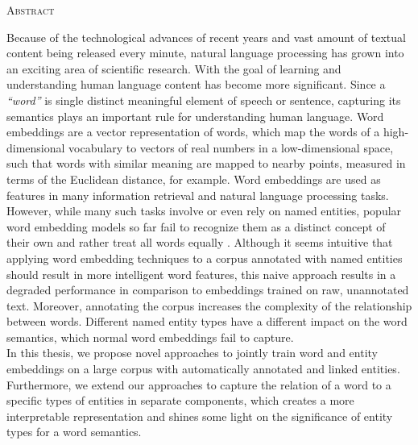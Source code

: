 \begin{center}
  \textsc{Abstract}
\end{center}
%
\noindent
%
Because of the technological advances of recent years and vast amount of textual content being released every minute, natural language processing has grown into an exciting area of scientific research. With the goal of learning and understanding human language content has become more significant.
Since a \emph{``word''} is single distinct meaningful element of speech or sentence, capturing its semantics plays an important rule for understanding human language.
Word embeddings are a vector representation of words, which map the words of a high-dimensional vocabulary to vectors of real numbers in a low-dimensional space, such that words with similar meaning are mapped to nearby points, measured in terms of the Euclidean distance, for example.
Word embeddings are used as features in many information retrieval and natural language processing tasks. However, while many such tasks involve or even rely on named entities, popular word embedding models so far fail to recognize them as a distinct concept of their own and rather treat all words equally .
Although it seems intuitive that applying word embedding techniques to a corpus annotated with named entities should result in more intelligent word features, this naive approach results in a degraded performance in comparison to embeddings trained on raw, unannotated text.
Moreover, annotating the corpus increases the complexity of the relationship between words. Different named entity types have a different impact on the word semantics, which normal word embeddings fail to capture.
\\
In this thesis, we propose novel approaches to jointly train word and entity embeddings on a large corpus with automatically annotated and linked entities.
Furthermore, we extend our approaches to capture the relation of a word to a specific types of entities in separate components, which creates a more interpretable representation and shines some light on the significance of entity types for a word semantics.
